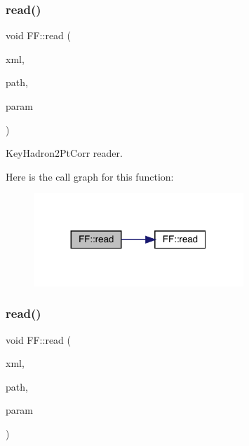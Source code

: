 \subsubsection{\texorpdfstring{read()}{read()}\hspace{0.1cm}{\footnotesize\ttfamily [7/14]}}
{\footnotesize\ttfamily void F\+F\+::read (\begin{DoxyParamCaption}\item[{X\+M\+L\+Reader \&}]{xml,  }\item[{const std\+::string \&}]{path,  }\item[{\mbox{\hyperlink{structFF_1_1KeyHadron2PtCorr__t}{Key\+Hadron2\+Pt\+Corr\+\_\+t}} \&}]{param }\end{DoxyParamCaption})}



Key\+Hadron2\+Pt\+Corr reader. 

Here is the call graph for this function\+:
\nopagebreak
\begin{figure}[H]
\begin{center}
\leavevmode
\includegraphics[width=224pt]{d5/da6/namespaceFF_ac879699f10e046e5a2059a2efcf1408b_cgraph}
\end{center}
\end{figure}
\mbox{\label{namespaceFF_a4e59e8e764d20bb787e2992c247ca80f}} 
\subsubsection{\texorpdfstring{read()}{read()}\hspace{0.1cm}{\footnotesize\ttfamily [8/14]}}
{\footnotesize\ttfamily void F\+F\+::read (\begin{DoxyParamCaption}\item[{X\+M\+L\+Reader \&}]{xml,  }\item[{const std\+::string \&}]{path,  }\item[{\mbox{\hyperlink{structFF_1_1DiscoKeyOperator__t}{Disco\+Key\+Operator\+\_\+t}} \&}]{param }\end{DoxyParamCaption})}



